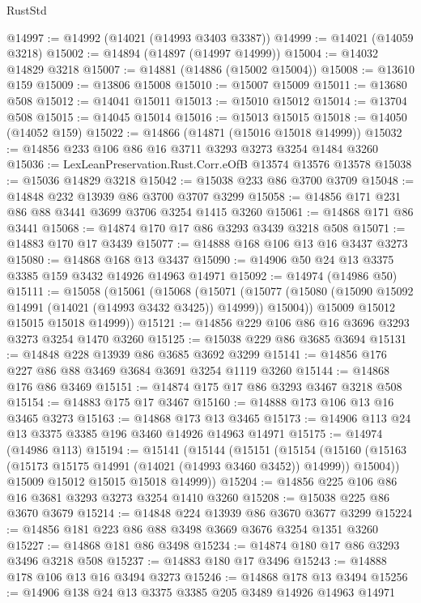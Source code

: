 \begin{lexlean}{RustStd}
\begin{coremodule}
@14997 := @14992 (@14021 (@14993 @3403 @3387))
@14999 := @14021 (@14059 @3218)
@15002 := @14894 (@14897 (@14997 @14999))
@15004 := @14032 @14829 @3218
@15007 := @14881 (@14886 (@15002 @15004))
@15008 := @13610 @159
@15009 := @13806 @15008
@15010 := @15007 @15009
@15011 := @13680 @508
@15012 := @14041 @15011
@15013 := @15010 @15012
@15014 := @13704 @508
@15015 := @14045 @15014
@15016 := @15013 @15015
@15018 := @14050 (@14052 @159)
@15022 := @14866 (@14871 (@15016 @15018 @14999))
@15032 := @14856 @233 @106 @86 @16 @3711 @3293 @3273 @3254 @1484 @3260
@15036 := LexLeanPreservation.Rust.Corr.eOfB @13574 @13576 @13578
@15038 := @15036 @14829 @3218
@15042 := @15038 @233 @86 @3700 @3709
@15048 := @14848 @232 @13939 @86 @3700 @3707 @3299
@15058 := @14856 @171 @231 @86 @88 @3441 @3699 @3706 @3254 @1415 @3260
@15061 := @14868 @171 @86 @3441
@15068 := @14874 @170 @17 @86 @3293 @3439 @3218 @508
@15071 := @14883 @170 @17 @3439
@15077 := @14888 @168 @106 @13 @16 @3437 @3273
@15080 := @14868 @168 @13 @3437
@15090 := @14906 @50 @24 @13 @3375 @3385 @159 @3432 @14926 @14963 @14971
@15092 := @14974 (@14986 @50)
@15111 := @15058
    (@15061
      (@15068
        (@15071
          (@15077 (@15080 (@15090 @15092 @14991 (@14021 (@14993 @3432 @3425)) @14999)) @15004))
        @15009
        @15012
        @15015
        @15018
        @14999))
@15121 := @14856 @229 @106 @86 @16 @3696 @3293 @3273 @3254 @1470 @3260
@15125 := @15038 @229 @86 @3685 @3694
@15131 := @14848 @228 @13939 @86 @3685 @3692 @3299
@15141 := @14856 @176 @227 @86 @88 @3469 @3684 @3691 @3254 @1119 @3260
@15144 := @14868 @176 @86 @3469
@15151 := @14874 @175 @17 @86 @3293 @3467 @3218 @508
@15154 := @14883 @175 @17 @3467
@15160 := @14888 @173 @106 @13 @16 @3465 @3273
@15163 := @14868 @173 @13 @3465
@15173 := @14906 @113 @24 @13 @3375 @3385 @196 @3460 @14926 @14963 @14971
@15175 := @14974 (@14986 @113)
@15194 := @15141
    (@15144
      (@15151
        (@15154
          (@15160 (@15163 (@15173 @15175 @14991 (@14021 (@14993 @3460 @3452)) @14999)) @15004))
        @15009
        @15012
        @15015
        @15018
        @14999))
@15204 := @14856 @225 @106 @86 @16 @3681 @3293 @3273 @3254 @1410 @3260
@15208 := @15038 @225 @86 @3670 @3679
@15214 := @14848 @224 @13939 @86 @3670 @3677 @3299
@15224 := @14856 @181 @223 @86 @88 @3498 @3669 @3676 @3254 @1351 @3260
@15227 := @14868 @181 @86 @3498
@15234 := @14874 @180 @17 @86 @3293 @3496 @3218 @508
@15237 := @14883 @180 @17 @3496
@15243 := @14888 @178 @106 @13 @16 @3494 @3273
@15246 := @14868 @178 @13 @3494
@15256 := @14906 @138 @24 @13 @3375 @3385 @205 @3489 @14926 @14963 @14971

\end{coremodule}
\end{lexlean}
